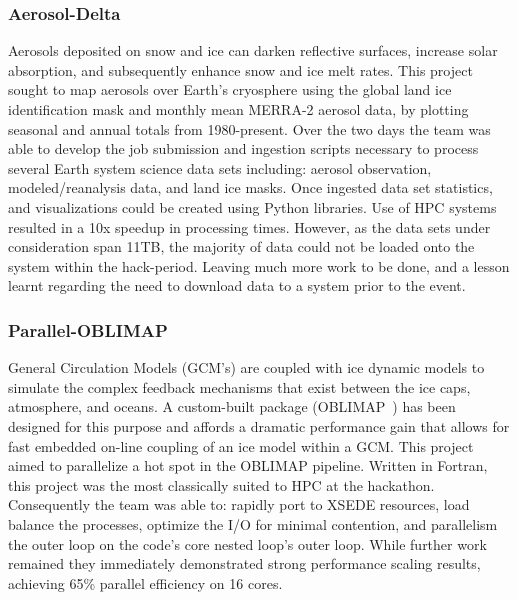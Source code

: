 \documentclass[conference]{IEEEtran}
\begin{document}
\subsubsection{Aerosol-Delta}
Aerosols deposited on snow and ice can darken reflective surfaces, increase solar absorption, and subsequently enhance snow and ice melt rates. This project sought to map aerosols over Earth's cryosphere using the global land ice identification mask and monthly mean MERRA-2 aerosol data, by plotting seasonal and annual totals from 1980-present. Over the two days the team was able to develop the job submission and ingestion scripts necessary to process several Earth system science data sets including: aerosol observation, modeled/reanalysis data, and land ice masks.  Once ingested data set statistics, and visualizations could be created using Python libraries.  Use of HPC systems resulted in a 10x speedup in processing times.  However, as the data sets under consideration span 11TB, the majority of data could not be loaded onto the system within the hack-period. Leaving much more work to be done, and a lesson learnt regarding the need to download data to a system prior to the event.
\subsubsection{Parallel-OBLIMAP}
General Circulation Models (GCM's) are coupled with ice dynamic models to simulate the complex feedback mechanisms that exist between the ice caps, atmosphere, and oceans. A custom-built package (OBLIMAP~\cite{Reerink2016-xr}) has been designed for this purpose and affords a dramatic performance gain that allows for fast embedded on-line coupling of an ice model within a GCM. This project aimed to parallelize a hot spot in the OBLIMAP pipeline.  Written in Fortran, this project was the most classically suited to HPC at the hackathon.  Consequently the team was able to: rapidly port to XSEDE resources, load balance the processes, optimize the I/O for minimal contention, and parallelism the outer loop on the code's core nested loop's outer loop.  While further work remained they immediately demonstrated strong performance scaling results, achieving 65\% parallel efficiency on 16 cores.
\end{document}
